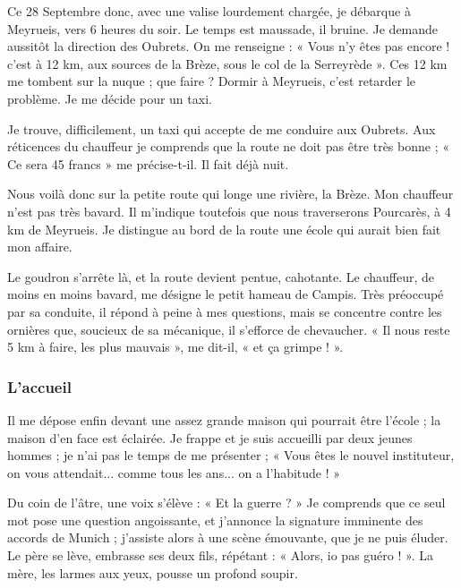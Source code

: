 Ce 28 Septembre donc, avec une valise lourdement chargée, je débarque à Meyrueis, vers 6 heures du soir. Le temps est maussade, il bruine. Je demande aussitôt la direction des Oubrets. On me renseigne : « Vous n'y êtes pas encore ! c'est à 12 km, aux sources de la Brèze, sous le col de la Serreyrède ». Ces 12 km me tombent sur la nuque ; que faire ? Dormir à Meyrueis, c'est retarder le problème. Je me décide pour un taxi.

Je trouve, difficilement, un taxi qui accepte de me conduire aux Oubrets. Aux réticences du chauffeur je comprends que la route ne doit pas être très bonne ; « Ce sera 45 francs » me précise-t-il. Il fait déjà nuit.

Nous voilà donc sur la petite route qui longe une rivière, la Brèze. Mon chauffeur n'est pas très bavard. Il m'indique toutefois que nous traverserons Pourcarès, à 4 km de Meyrueis. Je distingue au bord de la route une école qui aurait bien fait mon affaire.

Le goudron s'arrête là, et la route devient pentue, cahotante. Le chauffeur, de moins en moins bavard, me désigne le petit hameau de Campis. Très préoccupé par sa conduite, il répond à peine à mes questions, mais se concentre contre les ornières que, soucieux de sa mécanique, il s'efforce de chevaucher. « Il nous reste 5 km à faire, les plus mauvais », me dit-il, « et ça grimpe ! ».

\subsubsection{L'accueil}

Il me dépose enfin devant une assez grande maison qui pourrait être l'école ; la maison d'en face est éclairée. Je frappe et je suis accueilli par deux jeunes hommes ; je n'ai pas le temps de me présenter ; « Vous êtes le nouvel instituteur, on vous attendait... comme tous les ans... on a l'habitude ! »


Du coin de l'âtre, une voix s'élève : « Et la guerre ? » Je comprends que ce seul mot
pose une question angoissante, et j'annonce la signature imminente des accords de
Munich ; j'assiste alors à une scène émouvante, que je ne puis éluder. Le père se lève,
embrasse ses deux fils, répétant : « Alors, io pas guéro ! ». La mère, les larmes aux
yeux, pousse un profond soupir.

